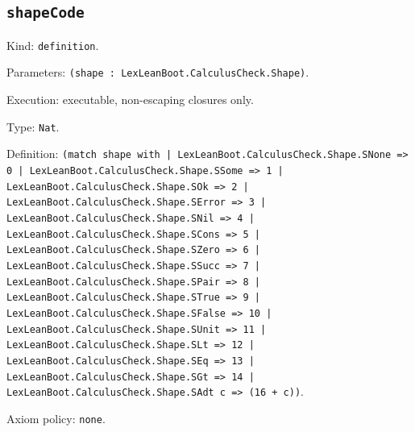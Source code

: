 \documentclass[11pt]{article}
\begin{document}
\subsection*{\texttt{shapeCode}}
\noindent Kind: \texttt{definition}.\par
\noindent Parameters: \texttt{(shape : LexLeanBoot.CalculusCheck.Shape)}.\par
\noindent Execution: executable, non-escaping closures only.\par
\noindent Type: \texttt{Nat}.\par
\noindent Definition: \texttt{(match shape with | LexLeanBoot.CalculusCheck.Shape.SNone => 0 | LexLeanBoot.CalculusCheck.Shape.SSome => 1 | LexLeanBoot.CalculusCheck.Shape.SOk => 2 | LexLeanBoot.CalculusCheck.Shape.SError => 3 | LexLeanBoot.CalculusCheck.Shape.SNil => 4 | LexLeanBoot.CalculusCheck.Shape.SCons => 5 | LexLeanBoot.CalculusCheck.Shape.SZero => 6 | LexLeanBoot.CalculusCheck.Shape.SSucc => 7 | LexLeanBoot.CalculusCheck.Shape.SPair => 8 | LexLeanBoot.CalculusCheck.Shape.STrue => 9 | LexLeanBoot.CalculusCheck.Shape.SFalse => 10 | LexLeanBoot.CalculusCheck.Shape.SUnit => 11 | LexLeanBoot.CalculusCheck.Shape.SLt => 12 | LexLeanBoot.CalculusCheck.Shape.SEq => 13 | LexLeanBoot.CalculusCheck.Shape.SGt => 14 | LexLeanBoot.CalculusCheck.Shape.SAdt c => (16 + c))}.\par
\noindent Axiom policy: \texttt{none}.\par
\end{document}
